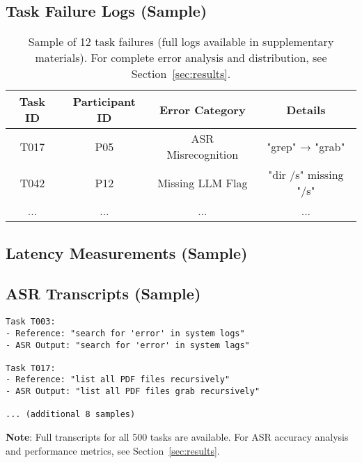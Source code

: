 \documentclass[a4paper,12pt]{article}
\begin{document}
\subsection{Task Failure Logs (Sample)}
\begin{table}[h!]
\centering
\begin{tabular}{|c|c|c|c|}
\hline
\textbf{Task ID} & \textbf{Participant ID} & \textbf{Error Category} & \textbf{Details} \\
\hline
T017 & P05 & ASR Misrecognition & "grep" → "grab" \\
T042 & P12 & Missing LLM Flag & "dir /s" missing "/s" \\
... & ... & ... & ... \\
\hline
\end{tabular}
\caption{Sample of 12 task failures (full logs available in supplementary materials). For complete error analysis and distribution, see Section~\ref{sec:results}.}
\end{table}

\subsection{Latency Measurements (Sample)}
\begin{table}[h!]
\centering
{}
\caption{Sample of 10 latency measurements from the study (full dataset available in supplementary materials). For comprehensive latency analysis and breakdown, see Section~\ref{sec:results}.}
\end{table}

\subsection{ASR Transcripts (Sample)}
\begin{verbatim}
Task T003: 
- Reference: "search for 'error' in system logs"
- ASR Output: "search for 'error' in system lags"

Task T017: 
- Reference: "list all PDF files recursively"
- ASR Output: "list all PDF files grab recursively"

... (additional 8 samples)
\end{verbatim}
\noindent \textbf{Note}: Full transcripts for all 500 tasks are available. For ASR accuracy analysis and performance metrics, see Section~\ref{sec:results}.
\end{document}
